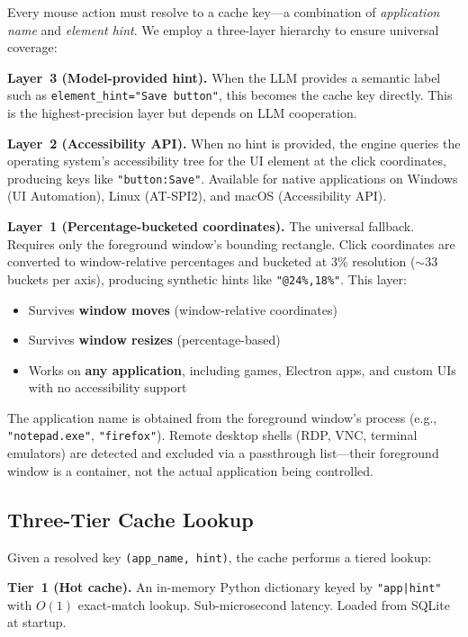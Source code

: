 \documentclass[conference]{IEEEtran}
\begin{document}
Every mouse action must resolve to a cache key---a combination of \emph{application name} and \emph{element hint}. We employ a three-layer hierarchy to ensure universal coverage:

\textbf{Layer~3 (Model-provided hint).} When the LLM provides a semantic label such as \texttt{element\_hint="Save button"}, this becomes the cache key directly. This is the highest-precision layer but depends on LLM cooperation.

\textbf{Layer~2 (Accessibility API).} When no hint is provided, the engine queries the operating system's accessibility tree for the UI element at the click coordinates, producing keys like \texttt{"button:Save"}. Available for native applications on Windows (UI Automation), Linux (AT-SPI2), and macOS (Accessibility API).

\textbf{Layer~1 (Percentage-bucketed coordinates).} The universal fallback. Requires only the foreground window's bounding rectangle. Click coordinates are converted to window-relative percentages and bucketed at 3\% resolution (${\sim}33$ buckets per axis), producing synthetic hints like \texttt{"@24\%,18\%"}. This layer:

\begin{itemize}[noitemsep,topsep=0pt]
    \item Survives \textbf{window moves} (window-relative coordinates)
    \item Survives \textbf{window resizes} (percentage-based)
    \item Works on \textbf{any application}, including games, Electron apps, and custom UIs with no accessibility support
\end{itemize}

The application name is obtained from the foreground window's process (e.g., \texttt{"notepad.exe"}, \texttt{"firefox"}). Remote desktop shells (RDP, VNC, terminal emulators) are detected and excluded via a passthrough list---their foreground window is a container, not the actual application being controlled.

\subsection{Three-Tier Cache Lookup}

Given a resolved key \texttt{(app\_name, hint)}, the cache performs a tiered lookup:

\textbf{Tier~1 (Hot cache).} An in-memory Python dictionary keyed by \texttt{"app|hint"} with $O(1)$ exact-match lookup. Sub-microsecond latency. Loaded from SQLite at startup.
\end{document}
